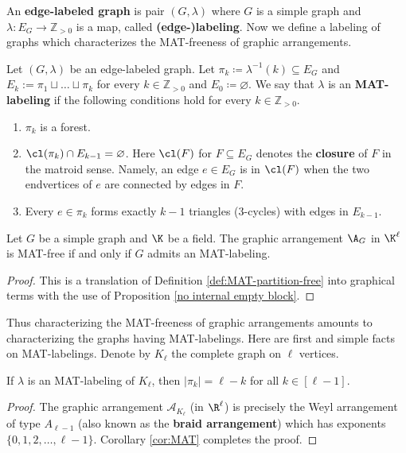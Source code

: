 An \textbf{edge-labeled graph} is pair $ (G,\lambda) $ where $ G $ is a simple graph and  $\mbox{$\lambda \colon E_{G} \to \mathbb{Z}_{>0}$}$ is a map, called \textbf{(edge-)labeling}. 
Now we define a labeling of graphs which characterizes the MAT-freeness of graphic arrangements.
\begin{definition}
\label{definition MAT-labeling}
Let $ (G,\lambda) $ be an  edge-labeled graph. 
Let $ \pi_{k} \coloneqq \lambda^{-1}(k) \subseteq E_{G}$ and $ E_{k} := \pi_{1} \sqcup \dots \sqcup \pi_{k} $ for every $ k \in \mathbb{Z}_{>0} $ and $ E_{0} \coloneqq \varnothing $. 
We say that $ \lambda $ is an \textbf{MAT-labeling} if the following conditions hold for every $ k \in \mathbb{Z}_{>0} $. 
\begin{enumerate}[(ML1)]
\item\label{definition MAT-labeling forest} $ \pi_{k} $ is a forest. 
\item\label{definition MAT-labeling closure} $ \cl(\pi_{k}) \cap E_{k-1} = \varnothing $. 
Here  $\cl(F)$ for $F \subseteq E_{G}$ denotes the \textbf{closure} of $F$ in the matroid sense. Namely,
an edge $e\in E_{G}$ is in $\cl(F)$ when the two endvertices of $e$ are connected by edges in $F$.
\item\label{definition MAT-labeling triangle} Every $ e \in \pi_{k} $ forms exactly $ k-1 $ triangles ($3$-cycles) with edges in $ E_{k-1} $. 
\end{enumerate}
\end{definition}

\begin{proposition}
\label{prop:MATF=MATL}
Let $G$ be a simple graph and $\K$ be a field. 
The graphic arrangement $\A_G$ in $\K^\ell$ is MAT-free if and only if $ G $ admits an MAT-labeling. 
\end{proposition}
\begin{proof}
This is a translation of Definition \ref{def:MAT-partition-free} into graphical terms with the use of Proposition \ref{no internal empty block}. 
\end{proof}

Thus characterizing the MAT-freeness of graphic arrangements amounts to characterizing the graphs having MAT-labelings. 
Here are first and simple facts on MAT-labelings.
Denote by $ K_{\ell} $ the complete graph on $ \ell $ vertices. 
\begin{proposition}\label{MAT-labeling on complete graph}
If $ \lambda $ is an MAT-labeling of $ K_{\ell} $, then $ |\pi_{k}| = \ell-k $ for all $ k \in [\ell-1] $. 
\end{proposition}
\begin{proof}
The graphic arrangement $ \mathcal{A}_{K_{\ell}} $ (in $\R^\ell$) is precisely the Weyl arrangement of type $A_{\ell-1}$ (also known as the \textbf{braid arrangement}) which has exponents $ \{0,1,2, \dots, \ell-1\}$.
Corollary \ref{cor:MAT} completes the proof.
\end{proof}

